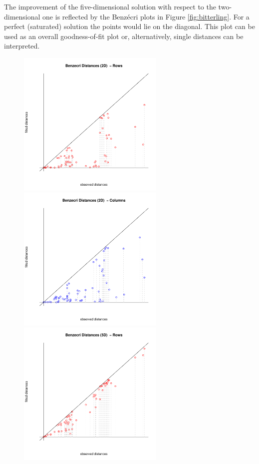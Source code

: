 \documentclass[article]{Z}
\begin{document}
The improvement of the five-dimensional solution with respect to the two-dimensional one is reflected by the Benz\'ecri plots in Figure \ref{fig:bitterling}. For a perfect (saturated) solution the points would lie on the diagonal. 
This plot can be used as an overall goodness-of-fit plot or, alternatively, single distances can be interpreted. 

\begin{figure}[h]
\begin{center}
\includegraphics[height=70mm, width=70mm]{bit2drows.pdf}
\includegraphics[height=70mm, width=70mm]{bit2dcols.pdf}
\includegraphics[height=70mm, width=70mm]{bit5drows.pdf}

\end{center}
\end{figure}
\end{document}
